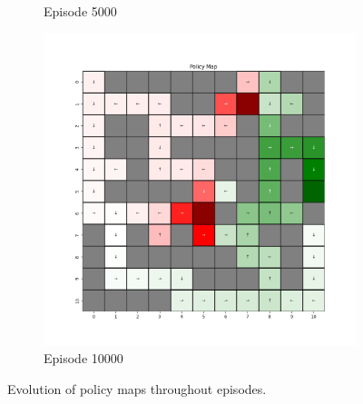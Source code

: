 \documentclass{assignment}
\begin{document}
\begin{figure}[H]
\begin{subfigure}{0.3\textwidth}
    \caption{Episode 5000}
    \end{subfigure}\hfill
    \begin{subfigure}{0.3\textwidth}
        \includegraphics[width=\textwidth]{figures/policy_td/alpha_sweep/policy_alpha_0.1_gamma_0.95_epsilon_0.2_iteration_10000.png}
    \caption{Episode 10000}
    \end{subfigure}
    \caption{Evolution of policy maps throughout episodes.}
    \label{fig:alpha_0.1_td_learning_policy}
\end{figure}
\end{document}
